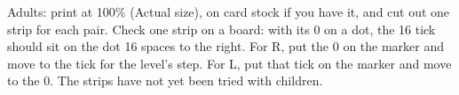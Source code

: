 \documentclass[11pt,letterpaper]{article}
\newcommand{\stridestrip}[1]{%
 \begin{scope}[yshift=#1]
  \draw[line width=.5pt] (-.25,0) rectangle (4.0,-.62);
  \draw[line width=1.2pt] (0,0)--(0,-.34);
  \foreach \s in {1,2,4,8,16} {\draw[line width=.6pt] ({.23*\s},0)--({.23*\s},-.34);}
  \foreach \s in {0,1,2,4,8,16} {\node[below,font=\footnotesize,inner sep=1.5pt] at ({.23*\s},-.34) {\s};}
 \end{scope}}
\begin{document}
Adults: print at 100\% (Actual size), on card stock if you have it, and cut out one strip for each pair. Check one strip on a board: with its 0 on a dot, the 16 tick should sit on the dot 16 spaces to the right. For R, put the 0 on the marker and move to the tick for the level's step. For L, put that tick on the marker and move to the 0. The strips have not yet been tried with children.

\vspace{.15in}
\begin{center}
\end{center}
\end{document}
